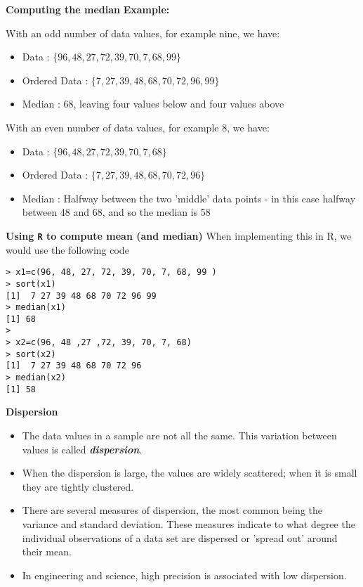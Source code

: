 \documentclass[]{report}
\begin{document}
\noindent \textbf{Computing the median}
\textbf{Example:}


With an odd number of data values, for example nine, we have:
\begin{itemize}
	\item Data : $\{96, 48, 27, 72, 39, 70, 7, 68, 99 \}$
	\item Ordered Data :  $\{7, 27, 39, 48, 68, 70, 72, 96, 99\}$
	\item Median : 68, leaving four values below and four values above
\end{itemize}
\bigskip
With an even number of data values, for example 8, we have:
\begin{itemize}
	\item Data : $\{96, 48 ,27 ,72, 39, 70, 7, 68  \}$
	\item Ordered Data : $\{7, 27, 39, 48, 68, 70, 72, 96\}$
	\item Median : Halfway between the two 'middle' data points - in this case halfway between 48 and 68, and so the median is 58
\end{itemize}

\noindent \textbf{Using \texttt{R} to compute mean (and median)}
When implementing this in R, we would use the following code

\begin{verbatim}
> x1=c(96, 48, 27, 72, 39, 70, 7, 68, 99 )
> sort(x1)
[1]  7 27 39 48 68 70 72 96 99
> median(x1)
[1] 68
>
> x2=c(96, 48 ,27 ,72, 39, 70, 7, 68)
> sort(x2)
[1]  7 27 39 48 68 70 72 96
> median(x2)
[1] 58
\end{verbatim}



\noindent \textbf{Dispersion }

\begin{itemize}
	\item The data values in a sample are not all the same. This variation between values is called \textbf{ \emph{dispersion}}.
	
	\item When the dispersion is large, the values are widely scattered; when it is small they are tightly clustered.
	
	
	\item
	There are several measures of dispersion, the most common being the variance and  standard deviation. These measures indicate to what degree the individual observations of a data set are dispersed or 'spread out' around their mean.
	
	\item
	In engineering and science, high precision is associated with low dispersion.
\end{itemize}
\end{document}
